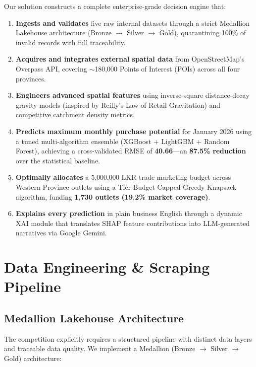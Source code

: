 \documentclass[10.75pt, a4paper]{article}
\begin{document}
Our solution constructs a complete enterprise-grade decision engine that:

\begin{enumerate}[label=\arabic*.]
    \item \textbf{Ingests and validates} five raw internal datasets through a strict Medallion Lakehouse architecture (Bronze $\rightarrow$ Silver $\rightarrow$ Gold), quarantining 100\% of invalid records with full traceability.
    \item \textbf{Acquires and integrates external spatial data} from OpenStreetMap's Overpass API, covering $\sim$180,000 Points of Interest (POIs) across all four provinces.
    \item \textbf{Engineers advanced spatial features} using inverse-square distance-decay gravity models (inspired by Reilly's Law of Retail Gravitation) and competitive catchment density metrics.
    \item \textbf{Predicts maximum monthly purchase potential} for January 2026 using a tuned multi-algorithm ensemble (XGBoost + LightGBM + Random Forest), achieving a cross-validated RMSE of \textbf{40.66}---an \textbf{87.5\% reduction} over the statistical baseline.
    \item \textbf{Optimally allocates} a 5,000,000 LKR trade marketing budget across Western Province outlets using a Tier-Budget Capped Greedy Knapsack algorithm, funding \textbf{1,730 outlets (19.2\% market coverage)}.
    \item \textbf{Explains every prediction} in plain business English through a dynamic XAI module that translates SHAP feature contributions into LLM-generated narratives via Google Gemini.
\end{enumerate}

\section{Data Engineering \& Scraping Pipeline}

\subsection{Medallion Lakehouse Architecture}

The competition explicitly requires a structured pipeline with distinct data layers and traceable data quality. We implement a Medallion (Bronze $\rightarrow$ Silver $\rightarrow$ Gold) architecture:
\end{document}
